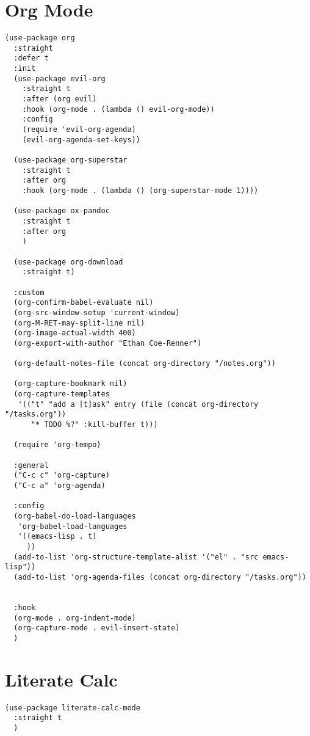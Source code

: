 \documentclass[11pt]{article}
\begin{document}
\section{Org Mode}
\label{sec:org2a1e516}
\begin{verbatim}
(use-package org
  :straight
  :defer t
  :init
  (use-package evil-org
    :straight t
    :after (org evil)
    :hook (org-mode . (lambda () evil-org-mode))
    :config
    (require 'evil-org-agenda)
    (evil-org-agenda-set-keys))

  (use-package org-superstar
    :straight t
    :after org
    :hook (org-mode . (lambda () (org-superstar-mode 1))))

  (use-package ox-pandoc
    :straight t
    :after org
    )

  (use-package org-download
    :straight t)

  :custom
  (org-confirm-babel-evaluate nil)
  (org-src-window-setup 'current-window)
  (org-M-RET-may-split-line nil)
  (org-image-actual-width 400)
  (org-export-with-author "Ethan Coe-Renner")

  (org-default-notes-file (concat org-directory "/notes.org"))

  (org-capture-bookmark nil)
  (org-capture-templates
   '(("t" "add a [t]ask" entry (file (concat org-directory "/tasks.org"))
      "* TODO %?" :kill-buffer t)))

  (require 'org-tempo)

  :general
  ("C-c c" 'org-capture)
  ("C-c a" 'org-agenda)

  :config
  (org-babel-do-load-languages
   'org-babel-load-languages
   '((emacs-lisp . t)
     ))
  (add-to-list 'org-structure-template-alist '("el" . "src emacs-lisp"))
  (add-to-list 'org-agenda-files (concat org-directory "/tasks.org"))


  :hook
  (org-mode . org-indent-mode)
  (org-capture-mode . evil-insert-state)
  )
\end{verbatim}
\section{Literate Calc}
\label{sec:org988bc18}
\begin{verbatim}
(use-package literate-calc-mode
  :straight t
  )
\end{verbatim}
\end{document}
